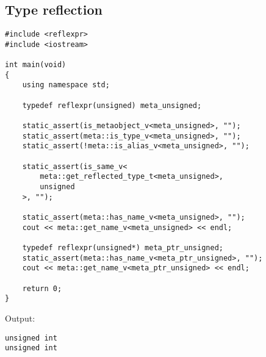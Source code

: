 \subsection{Type reflection}

\begin{verbatim}
#include <reflexpr>
#include <iostream>

int main(void)
{
	using namespace std;

	typedef reflexpr(unsigned) meta_unsigned;

	static_assert(is_metaobject_v<meta_unsigned>, "");
	static_assert(meta::is_type_v<meta_unsigned>, "");
	static_assert(!meta::is_alias_v<meta_unsigned>, "");

	static_assert(is_same_v<
		meta::get_reflected_type_t<meta_unsigned>,
		unsigned
	>, "");

	static_assert(meta::has_name_v<meta_unsigned>, "");
	cout << meta::get_name_v<meta_unsigned> << endl;

	typedef reflexpr(unsigned*) meta_ptr_unsigned;
	static_assert(meta::has_name_v<meta_ptr_unsigned>, "");
	cout << meta::get_name_v<meta_ptr_unsigned> << endl;

	return 0;
}
\end{verbatim}

Output:

\begin{verbatim}
unsigned int
unsigned int
\end{verbatim}

